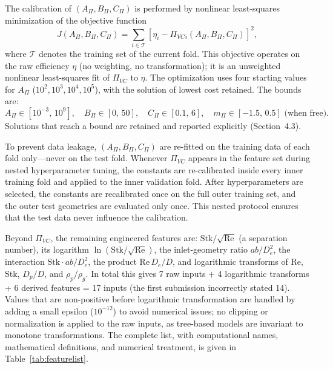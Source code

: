 \documentclass[12pt]{article}
\newcommand{\Stk}{\mathrm{Stk}}
\newcommand{\Rey}{\mathrm{Re}}
\newcommand{\PiVC}{\Pi_{VC}}
\begin{document}
The calibration of $(A_\Pi, B_\Pi, C_\Pi)$ is performed by nonlinear least-squares minimization of the objective function
\begin{equation}
J(A_\Pi, B_\Pi, C_\Pi) = \sum_{i \in \mathcal{T}} \left[\eta_i - \PiVC{}_i(A_\Pi, B_\Pi, C_\Pi)\right]^2,
\label{eq:objective}
\end{equation}
where $\mathcal{T}$ denotes the training set of the current fold. This objective operates on the raw efficiency $\eta$ (no weighting, no transformation); it is an unweighted nonlinear least-squares fit of $\PiVC$ to $\eta$. The optimization uses four starting values for $A_\Pi$ ($10^2, 10^3, 10^4, 10^5$), with the solution of lowest cost retained. The bounds are:
\begin{equation}
A_\Pi \in [10^{-3},\, 10^9], \quad B_\Pi \in [0,\, 50], \quad C_\Pi \in [0.1,\, 6], \quad m_\Pi \in [-1.5,\, 0.5] \text{ (when free)}.
\end{equation}
Solutions that reach a bound are retained and reported explicitly (Section~4.3).

To prevent data leakage, $(A_\Pi, B_\Pi, C_\Pi)$ are re-fitted on the training data of each fold only---never on the test fold. Whenever $\PiVC$ appears in the feature set during nested hyperparameter tuning, the constants are re-calibrated inside every inner training fold and applied to the inner validation fold. After hyperparameters are selected, the constants are recalibrated once on the full outer training set, and the outer test geometries are evaluated only once. This nested protocol ensures that the test data never influence the calibration.

Beyond $\PiVC$, the remaining engineered features are: $\Stk/\sqrt{\Rey}$ (a separation number), its logarithm $\ln(\Stk/\sqrt{\Rey})$, the inlet-geometry ratio $ab/D_e^2$, the interaction $\Stk \cdot ab/D_e^2$, the product $\Rey\,D_e/D$, and logarithmic transforms of Re, Stk, $D_p/D$, and $\rho_p/\rho_g$. In total this gives 7 raw inputs + 4 logarithmic transforms + 6 derived features = 17 inputs (the first submission incorrectly stated 14). Values that are non-positive before logarithmic transformation are handled by adding a small epsilon ($10^{-12}$) to avoid numerical issues; no clipping or normalization is applied to the raw inputs, as tree-based models are invariant to monotone transformations. The complete list, with computational names, mathematical definitions, and numerical treatment, is given in Table~\ref{tab:featurelist}.
\end{document}
